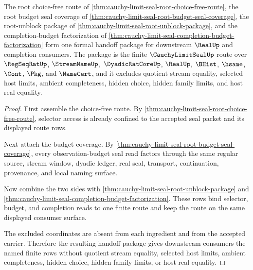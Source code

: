 \begin{theorem}
\label{thm:cauchy-limit-seal-root-formal-handoff-package}
The root choice-free route of \autoref{thm:cauchy-limit-seal-root-choice-free-route}, the root budget seal coverage of \autoref{thm:cauchy-limit-seal-root-budget-seal-coverage}, the root-unblock package of \autoref{thm:cauchy-limit-seal-root-unblock-package}, and the completion-budget factorization of \autoref{thm:cauchy-limit-seal-completion-budget-factorization} form one formal handoff package for downstream $\RealUp$ and completion consumers. The package is the finite $\CauchyLimitSealUp$ route over $\RegSeqRatUp$, $\StreamNameUp$, $\DyadicRatCoreUp$, $\RealUp$, $\BHist$, $\hsame$, $\Cont$, $\Pkg$, and $\NameCert$, and it excludes quotient stream equality, selected host limits, ambient completeness, hidden choice, hidden family limits, and host real equality.
\end{theorem}
\begin{proof}
First assemble the choice-free route. By \autoref{thm:cauchy-limit-seal-root-choice-free-route}, selector access is already confined to the accepted seal packet and its displayed route rows.

Next attach the budget coverage. By \autoref{thm:cauchy-limit-seal-root-budget-seal-coverage}, every observation-budget seal read factors through the same regular source, stream window, dyadic ledger, real seal, transport, continuation, provenance, and local naming surface.

Now combine the two sides with \autoref{thm:cauchy-limit-seal-root-unblock-package} and \autoref{thm:cauchy-limit-seal-completion-budget-factorization}. These rows bind selector, budget, and completion reads to one finite route and keep the route on the same displayed consumer surface.

The excluded coordinates are absent from each ingredient and from the accepted carrier. Therefore the resulting handoff package gives downstream consumers the named finite rows without quotient stream equality, selected host limits, ambient completeness, hidden choice, hidden family limits, or host real equality.
\end{proof}

